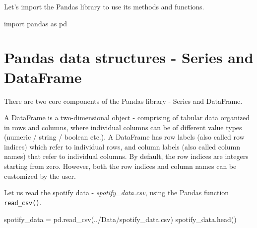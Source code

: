 \documentclass[
  letterpaper,
  DIV=11,
  numbers=noendperiod]{scrreprt}
\newenvironment{Shaded}{\begin{snugshade}}{\end{snugshade}}
\newcommand{\ImportTok}[1]{\textcolor[rgb]{0.00,0.46,0.62}{#1}}
\newcommand{\NormalTok}[1]{\textcolor[rgb]{0.00,0.23,0.31}{#1}}
\newcommand{\OperatorTok}[1]{\textcolor[rgb]{0.37,0.37,0.37}{#1}}
\newcommand{\StringTok}[1]{\textcolor[rgb]{0.13,0.47,0.30}{#1}}
\begin{document}
Let's import the Pandas library to use its methods and functions.

\begin{Shaded}
\begin{Highlighting}[]
\ImportTok{import}\NormalTok{ pandas }\ImportTok{as}\NormalTok{ pd}
\end{Highlighting}
\end{Shaded}

\hypertarget{pandas-data-structures---series-and-dataframe}{%
\section{Pandas data structures - Series and
DataFrame}\label{pandas-data-structures---series-and-dataframe}}

There are two core components of the Pandas library - Series and
DataFrame.

A DataFrame is a two-dimensional object - comprising of tabular data
organized in rows and columns, where individual columns can be of
different value types (numeric / string / boolean etc.). A DataFrame has
row labels (also called row indices) which refer to individual rows, and
column labels (also called column names) that refer to individual
columns. By default, the row indices are integers starting from zero.
However, both the row indices and column names can be customized by the
user.

Let us read the spotify data - \emph{spotify\_data.csv}, using the
Pandas function \texttt{read\_csv()}.

\begin{Shaded}
\begin{Highlighting}[]
\NormalTok{spotify\_data }\OperatorTok{=}\NormalTok{ pd.read\_csv(}\StringTok{\textquotesingle{}../Data/spotify\_data.csv\textquotesingle{}}\NormalTok{)}
\NormalTok{spotify\_data.head()}
\end{Highlighting}
\end{Shaded}
\end{document}
